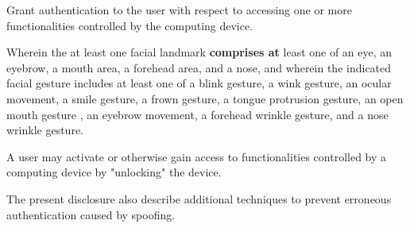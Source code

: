 Grant authentication to the user with respect to accessing one or more functionalities controlled by the computing device.

Wherein the at least one facial landmark \textbf{comprises at} least one of an eye, an eyebrow, a mouth area, a forehead area, and a nose, and wherein the indicated facial gesture includes at least one of a blink gesture, a wink gesture, an ocular movement, a smile gesture, a frown gesture, a tongue protrusion gesture, an open mouth gesture , an eyebrow movement, a forehead wrinkle gesture, and a nose wrinkle gesture.

A user may activate or otherwise gain access to functionalities controlled by a computing device by "unlocking" the device.

The present disclosure also describe additional techniques to prevent erroneous authentication caused by spoofing.
